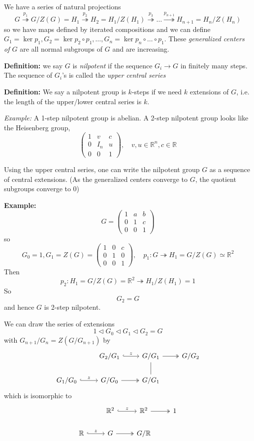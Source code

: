 \documentclass[12pt]{article}
\newcommand{\R}{\mathbb{R}}
\begin{document}
    We have a series of natural projections
    \[G \overset{p_1}{\twoheadrightarrow} G/Z(G) = H_1 \overset{p_2}{\twoheadrightarrow} H_2 = H_1/Z(H_1) \overset{p_3}{\twoheadrightarrow} \dots \overset{p_{n+1}}{\twoheadrightarrow} H_{n+1} = H_n/Z(H_n)\] 
    so we have maps defined by iterated compositions and we can define $G_1 = \ker p_1, G_2 = \ker p_2 \circ p_1, \dots, G_n = \ker p_n \circ \dots \circ p_1$. These \emph{generalized centers of $G$} are all normal subgroups of $G$ and are increasing. 

    \textbf{Definition:} we say $G$ is \emph{nilpotent} if the sequence $G_i \to G$ in finitely many steps. The sequence of $G_i$'s is called the \emph{upper central series}

    \textbf{Definition:} We say a nilpotent group is $k$-steps if we need $k$ extensions of $G$, i.e. the length of the upper/lower central series is $k$.

    \emph{Example:} A 1-step nilpotent group is abelian. A 2-step nilpotent group looks like the Heisenberg group, 
    \[\begin{pmatrix}
        1 & v & c\\ 
        0 & I_n & u\\ 
        0 & 0 & 1
    \end{pmatrix}, \quad v, u \in \R^n, c \in \R\]

    Using the upper central series, one can write the nilpotent group $G$ as a sequence of central extensions. (As the generalized centers converge to $G$, the quotient subgroups converge to 0)

    \textbf{Example:}
    \[G = \begin{pmatrix}
        1 & a & b\\ 
        0 & 1 & c\\ 
        0 & 0 & 1
    \end{pmatrix}\]
    so 
    \[G_0 = 1, G_1 = Z(G) = \begin{pmatrix}
        1 & 0 & c\\ 
        0 & 1 & 0\\ 
        0 & 0 & 1
    \end{pmatrix}, \quad p_1: G \twoheadrightarrow H_1 = G/Z(G) \simeq \R^2\]
    Then 
    \[p_2: H_1 = G/Z(G) = \R^2 \twoheadrightarrow H_1/Z(H_1) = 1\]
    So 
    \[G_2 = G\]
    and hence $G$ is 2-step nilpotent.

    We can draw the series of extensions 
    \[1 \triangleleft G_0 \triangleleft G_1 \triangleleft G_2 = G\]
    with $G_{n+1}/G_n = Z(G/G_{n+1})$ by 
    \[\begin{tikzcd}
        & G_2/G_1 \arrow[hook]{r}{z} & G/G_1 \arrow[two heads]{r} & G/G_2\\
        G_1/G_0 \arrow[hook]{r}{z} & G/G_0 \arrow[two heads]{r} & G/G_1 \arrow[no head]{u}
    \end{tikzcd}\] 
    which is isomorphic to 
    \[\begin{tikzcd}
        & \R^2 \arrow[hook]{r}{z} & \R^2 \arrow[two heads]{r} & 1\\
        \R \arrow[hook]{r}{z} & G \arrow[two heads]{r} & G/\R
    \end{tikzcd}\] 
\end{document}
